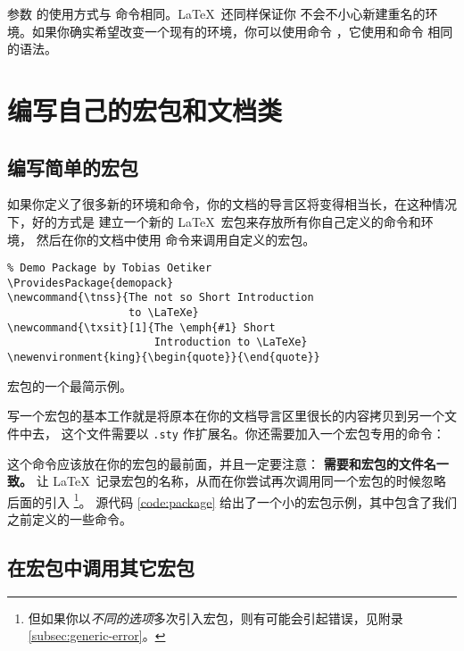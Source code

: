 参数  的使用方式与  命令相同。\LaTeX\ 还同样保证你
不会不小心新建重名的环境。如果你确实希望改变一个现有的环境，你可以使用命令
 ，它使用和命令  相同的语法。

\section{编写自己的宏包和文档类}

\subsection{编写简单的宏包}

如果你定义了很多新的环境和命令，你的文档的导言区将变得相当长，在这种情况下，好的方式是
建立一个新的 \LaTeX\ 宏包来存放所有你自己定义的命令和环境，
然后在你的文档中使用  命令来调用自定义的宏包。

\begin{sourcecode}[htbp]
\begin{Verbatim}
% Demo Package by Tobias Oetiker
\ProvidesPackage{demopack}
\newcommand{\tnss}{The not so Short Introduction
                   to \LaTeXe}
\newcommand{\txsit}[1]{The \emph{#1} Short
                       Introduction to \LaTeXe}
\newenvironment{king}{\begin{quote}}{\end{quote}}
\end{Verbatim}
\caption{宏包的一个最简示例。}\label{code:package}
\end{sourcecode}

写一个宏包的基本工作就是将原本在你的文档导言区里很长的内容拷贝到另一个文件中去，
 这个文件需要以 \texttt{.sty} 作扩展名。你还需要加入一个宏包专用的命令：
\begin{command}
\end{command}
这个命令应该放在你的宏包的最前面，并且一定要注意：\textbf{ 需要和宏包的文件名一致。}
 让 \LaTeX\ 记录宏包的名称，从而在你尝试再次调用同一个宏包的时候忽略后面的引入%
\footnote{但如果你以\emph{不同的选项}多次引入宏包，则有可能会引起错误，见附录 \ref{subsec:generic-error}。}。
源代码 \ref{code:package} 给出了一个小的宏包示例，其中包含了我们之前定义的一些命令。

\subsection{在宏包中调用其它宏包}

